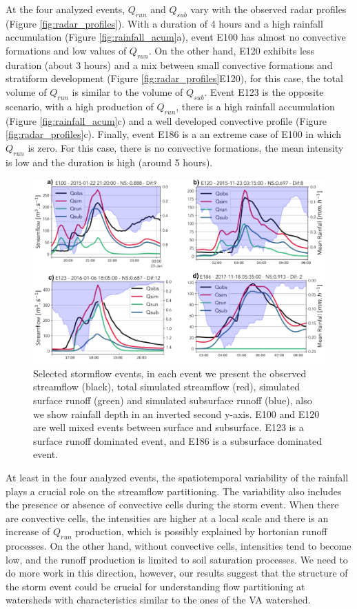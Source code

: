 \documentclass[preprint,12pt]{elsarticle}
\begin{document}
At the four analyzed events,  $Q_{run}$ and $Q_{sub}$ vary with the observed radar profiles (Figure \ref{fig:radar_profiles}). With a duration of 4 hours and a high rainfall accumulation (Figure \ref{fig:rainfall_acum}a), event E100 has almost no convective formations and low values of $Q_{run}$. On the other hand, E120 exhibits less duration (about 3 hours) and a mix between small convective formations and stratiform development (Figure \ref{fig:radar_profiles}E120), for this case,  the total volume of $Q_{run}$ is similar to the volume of $Q_{sub}$.  Event E123 is the opposite scenario, with a high production of $Q_{run}$, there is a high rainfall accumulation (Figure \ref{fig:rainfall_acum}c) and a well developed convective profile (Figure \ref{fig:radar_profiles}c). Finally, event E186 is a an extreme case of E100 in which $Q_{run}$ is zero. For this case, there is no convective formations, the mean intensity is low and the duration is high (around 5 hours). 

\begin{figure}[t]
    \centering
    \includegraphics[width=14cm]{Figuras/Cuatro_eventos.png}
    \caption{Selected stormflow events, in each event we present the observed streamflow (black), total simulated streamflow (red), simulated surface runoff (green) and simulated subsurface runoff (blue), also we show rainfall depth in an inverted second y-axis. E100 and E120 are well mixed events between surface and subsurface. E123 is a surface runoff dominated event, and E186 is a subsurface dominated event.}
    \label{fig:four_events}
\end{figure}
At least in the four analyzed events, the spatiotemporal variability of the rainfall  plays a crucial role on the streamflow partitioning. The variability also includes the presence or absence of convective cells during the storm event.  When there are convective cells, the intensities are higher at a local scale and there is an increase of  $Q_{run}$ production, which is possibly explained by hortonian runoff processes.  On the other hand, without convective cells, intensities tend to become low, and the runoff production is limited to soil saturation processes.  We need to do more work in this direction, however, our results suggest that the structure of the storm event could be crucial for understanding flow partitioning at watersheds with characteristics similar to the ones of the VA watershed. 
\end{document}
